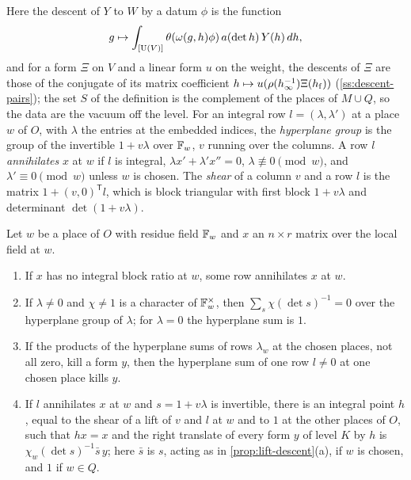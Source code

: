 Here the descent of $Y$ to $W$ by a datum $\phi$ is the function
\[
  g\mapsto\int_{[\operatorname{U}(V)]}\theta(\omega(g,h)\phi)\,a(\det h)\,Y(h)\,dh,
\]
and for a form $\Xi$ on $V$ and a linear form $u$ on the weight, the descents of $\Xi$ are those of the conjugate of its
matrix coefficient $h\mapsto u(\rho(h_\infty^{-1})\Xi(h_{\rm f}))$ (\cref{ss:descent-pairs}); the set $S$ of the definition is the complement of the places of $M\cup Q$, so the data are the vacuum off the level. For an
integral row $l=(\lambda,\lambda')$ at a place $w$ of $O$, with $\lambda$ the entries at the embedded indices, the \emph{hyperplane group} is the group of the invertible $1+v\lambda$ over $\mathbb{F}_w$, $v$ running over the
columns. A row $l$ \emph{annihilates} $x$ at $w$ if $l$ is integral, $\lambda x'+\lambda'x''=0$, $\lambda\not\equiv0\pmod w$, and $\lambda'\equiv0\pmod w$ unless $w$ is chosen. The \emph{shear} of a column $v$ and a row $l$ is the
matrix $1+(v,0)^{\mathsf T}l$, which is block triangular with first block $1+v\lambda$ and determinant $\det(1+v\lambda)$.

\begin{lemma}\label{lem:annihilating-rows}
Let $w$ be a place of $O$ with residue field $\mathbb{F}_w$ and $x$ an $n\times r$ matrix over the local field at $w$.
\begin{enumerate}[label=\textup{(\alph*)}]
\item If $x$ has no integral block ratio at $w$, some row annihilates $x$ at $w$.
\item If $\lambda\ne0$ and $\chi\ne1$ is a character of $\mathbb{F}_w^\times$, then $\sum_s\chi(\det s)^{-1}=0$ over the hyperplane group of $\lambda$; for $\lambda=0$ the hyperplane sum is $1$.
\item If the products of the hyperplane sums of rows $\lambda_w$ at the chosen places, not all zero, kill a form $y$, then the hyperplane sum of one row $l\ne0$ at one chosen place kills $y$.
\item If $l$ annihilates $x$ at $w$ and $s=1+v\lambda$ is invertible, there is an integral point $h$, equal to the shear of a lift of $v$ and $l$ at $w$ and to $1$ at the other places of $O$, such that $hx=x$ and
the right translate of every form $y$ of level $K$ by $h$ is $\chi_w(\det s)^{-1}\bar s\,y$; here $\bar s$ is $s$, acting as in \cref{prop:lift-descent}(a), if $w$ is chosen, and $1$ if $w\in Q$.
\end{enumerate}
\end{lemma}

